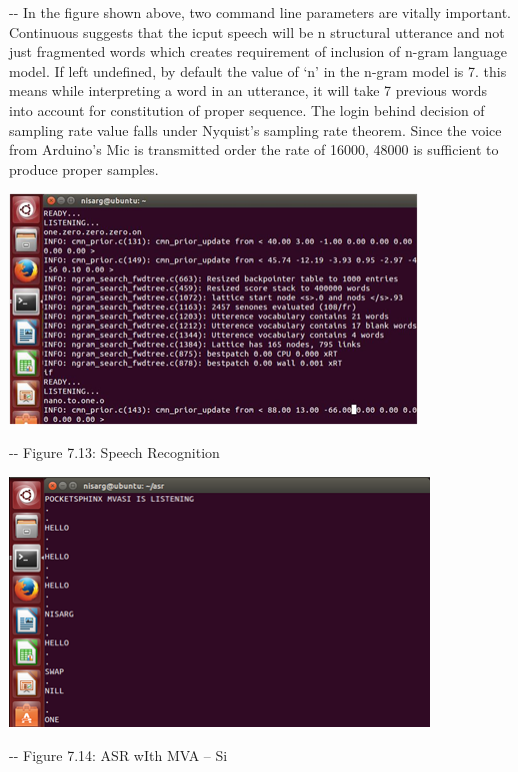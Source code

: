 \documentclass[12pt]{article}
\makeatletter
\newenvironment{indentation}[3]%
	{\par\setlength{\parindent}{#3}
	\setlength{\leftmargin}{#1}       \setlength{\rightmargin}{#2}%
	\advance\linewidth -\leftmargin       \advance\linewidth -\rightmargin%
	\advance\@totalleftmargin\leftmargin  \@setpar{{\@@par}}%
	\parshape 1\@totalleftmargin \linewidth\ignorespaces}{\par}%
\makeatother
\begin{document}
\begin{indentation}{0pt}{0pt}{0pt}
In the figure shown above, two command line parameters are vitally important.
Continuous suggests that the icput speech will be n structural utterance and not
just fragmented words which creates requirement of inclusion of n-gram language
model. If left undefined, by default the value of `n' in the n-gram model is 7.
this means while interpreting a word in an utterance, it will take 7 previous
words into account for constitution of proper sequence. The login behind decision
of sampling rate value falls under Nyquist's sampling rate theorem. Since the
voice from Arduino's Mic is transmitted order the rate of 16000, 48000 is
sufficient to produce proper samples.
\end{indentation}
\includegraphics[width=307pt]{img-26.png}
\begin{center}
\begin{indentation}{0pt}{0pt}{0pt}
Figure 7.13: Speech Recognition
\end{indentation}
\end{center}
\includegraphics[width=316pt]{img-27.png}
\begin{center}
\begin{indentation}{0pt}{0pt}{0pt}
Figure 7.14: ASR wIth MVA -- Si
\end{indentation}
\end{center}
\end{document}
